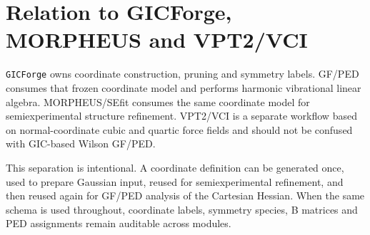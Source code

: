 \documentclass[11pt]{article}
\newcommand{\gicforge}{\texttt{GICForge}}
\begin{document}
\section{Relation to GICForge, MORPHEUS and VPT2/VCI}

\gicforge{} owns coordinate construction, pruning and symmetry labels.
GF/PED consumes that frozen coordinate model and performs harmonic vibrational
linear algebra.  MORPHEUS/SEfit consumes the same coordinate model for
semiexperimental structure refinement.  VPT2/VCI is a separate workflow based
on normal-coordinate cubic and quartic force fields and should not be confused
with GIC-based Wilson GF/PED.

This separation is intentional.  A coordinate definition can be generated once,
used to prepare Gaussian input, reused for semiexperimental refinement, and
then reused again for GF/PED analysis of the Cartesian Hessian.  When the same
schema is used throughout, coordinate labels, symmetry species, B matrices and
PED assignments remain auditable across modules.
\end{document}
